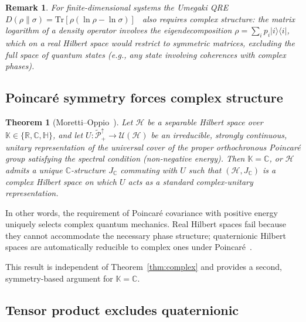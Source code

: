 \documentclass[letterpaper,twocolumn,superscriptaddress,longbibliography]{revtex4-2}
\newtheorem{theorem}{Theorem}[section]
\newtheorem*{remark}{Remark}
\newcommand{\Tr}{\mathrm{Tr}}
\newcommand{\hilb}{\mathcal{H}}
\newcommand{\op}[2]{|#1\rangle\langle#2|}
\begin{document}
\begin{remark}
For finite-dimensional systems the Umegaki QRE
$D(\rho\|\sigma) = \Tr[\rho(\ln\rho - \ln\sigma)]$~\cite{Umegaki1962}
also requires complex structure: the matrix logarithm of a
density operator involves the eigendecomposition
$\rho = \sum_i p_i \op{i}{i}$, which on a real Hilbert space
would restrict to symmetric matrices, excluding the full
space of quantum states (e.g., any state involving coherences
with complex phases).
\end{remark}

\subsection{Poincar\'{e} symmetry forces complex structure}
\label{sec:moretti}

\begin{theorem}[Moretti--Oppio~\cite{MorettiOppio2017}]
\label{thm:moretti_oppio}
Let $\hilb$ be a separable Hilbert space over
$\mathbb{K} \in \{\mathbb{R}, \mathbb{C}, \mathbb{H}\}$,
and let $U\!: \widetilde{\mathcal{P}}_+^\uparrow \to
\mathcal{U}(\hilb)$ be an irreducible, strongly continuous,
unitary representation of the universal cover of the
proper orthochronous Poincar\'{e} group satisfying the
spectral condition (non-negative energy).
Then $\mathbb{K} = \mathbb{C}$, or $\hilb$ admits a unique
$\mathbb{C}$-structure $J_{\mathbb{C}}$ commuting with $U$
such that $(\hilb, J_{\mathbb{C}})$ is a complex Hilbert
space on which $U$ acts as a standard complex-unitary
representation.
\end{theorem}

\noindent
In other words, the requirement of Poincar\'{e} covariance
with positive energy uniquely selects complex quantum mechanics.
Real Hilbert spaces fail because they cannot accommodate
the necessary phase structure; quaternionic Hilbert spaces
are automatically reducible to complex ones under
Poincar\'{e}~\cite{MorettiOppio2017}.

This result is independent of Theorem~\ref{thm:complex}
and provides a second, symmetry-based argument for
$\mathbb{K} = \mathbb{C}$.

\subsection{Tensor product excludes quaternionic}
\label{sec:no_quat}
\end{document}
